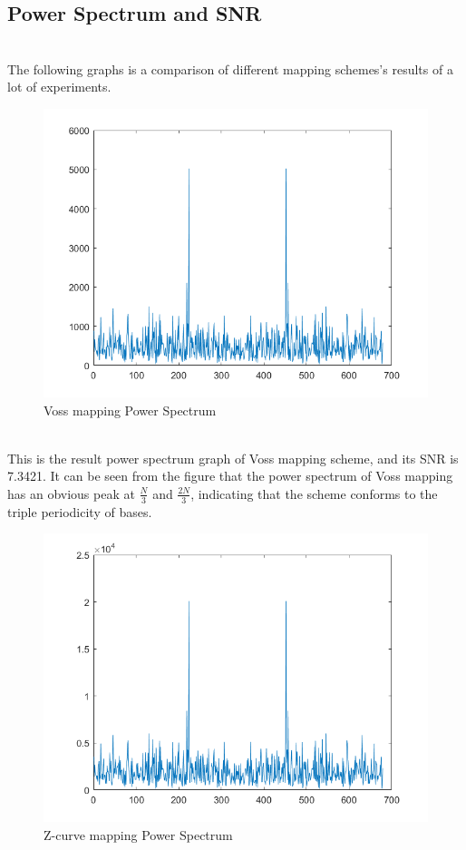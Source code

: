 \documentclass[conference]{IEEEtran}
\begin{document}
\subsection{Power Spectrum and SNR}
~\\ \indent The following graphs is a comparison of different mapping schemes's results of a lot of experiments.
\begin{figure}[H]
    \centering
    \includegraphics[width=\linewidth]{vossp.png}
    \caption{Voss mapping Power Spectrum}
    \label{vossp}
\end{figure}
~\\ \indent This is the result power spectrum graph of Voss mapping scheme, and its SNR is 7.3421. It can be seen from the figure that the power spectrum of Voss mapping has an obvious peak at $\frac{N}{3}$ and $\frac{2N}{3}$, indicating that the scheme conforms to the triple periodicity of bases.
\begin{figure}[H]
    \centering
    \includegraphics[width=\linewidth]{zcurvep.png}
    \caption{Z-curve mapping Power Spectrum}
    \label{zcurvep}
\end{figure}
\end{document}
